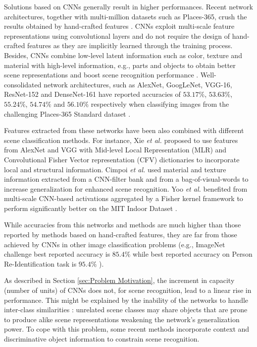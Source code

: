 \documentclass[review, 3p, sort&compress]{elsarticle}
\begin{document}
Solutions based on CNNs generally result in higher performances. Recent network architectures, together with multi-million datasets such as Places-365, crush the results obtained by hand-crafted features \cite{zhou2018places}. CNNs exploit multi-scale feature representations using convolutional layers and do not require the design of hand-crafted features as they are implicitly learned through the training process. Besides, CNNs combine low-level latent information such as color, texture and material with high-level information, e.g., parts and objects to obtain better scene representations and boost scene recognition performance \cite{bau2017network}. Well-consolidated network architectures, such as AlexNet, GoogLeNet, VGG-16, ResNet-152 and DenseNet-161 have reported accuracies of \(53.17\%\), \(53.63\%\), \(55.24\%\), \(54.74\%\) and \(56.10\%\) respectively when classifying images from the challenging Places-365 Standard dataset \cite{zhou2018places}.

Features extracted from these networks have been also combined with different scene classification methods. For instance, Xie \textit{et al.} \cite{xie2015hybrid} proposed to use features from AlexNet and VGG with Mid-level Local Representation (MLR) and Convolutional Fisher Vector representation (CFV) dictionaries to incorporate local and structural information. Cimpoi \textit{et al.} \cite{cimpoi2015deep} used material and texture information extracted from a CNN-filter bank and from a bag-of-visual-words to increase generalization for enhanced scene recognition. Yoo \textit{et al.} \cite{yoo2014fisher} benefited from multi-scale CNN-based activations aggregated by a Fisher kernel framework to perform significantly better on the MIT Indoor Dataset \cite{quattoni2009recognizing}.

While accuracies from this networks and methods are much higher than those reported by methods based on hand-crafted features, they are far from those achieved by CNNs in other image classification problems (e.g., ImageNet challenge best reported accuracy is \(85.4\%\) \cite{mahajan2018exploring} while best reported accuracy on Person Re-Identification task is \(95.4\%\) \cite{quan2019auto}). 

As described in Section \ref{sec:Problem Motivation}, the increment in capacity (number of units) of CNNs does not, for scene recognition, lead to a linear rise in performance. This might be explained by the inability of the networks to handle inter-class similarities \cite{cheng2018scene}: unrelated scene classes may share objects that are prone to produce alike scene representations weakening the network's generalization power. To cope with this problem, some recent methods incorporate context and discriminative object information to constrain scene recognition. 
\end{document}
